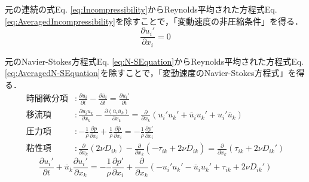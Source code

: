 \documentclass[12pt,a4paper]{jsarticle}
\begin{document}
元の連続の式Eq. \ref{eq:Incompressibility}からReynolds平均された方程式Eq. \ref{eq:AveragedIncompressibility}を除すことで，「変動速度の非圧縮条件」を得る．
\begin{equation}
  \frac{\partial u_i'}{\partial x_i} = 0 \tag{6.10}
  \label{eq:N-S-AveragedIncompressibility}
\end{equation}

元のNavier-Stokes方程式Eq. \ref{eq:N-SEquation}からReynolds平均された方程式Eq. \ref{eq:AveragedN-SEquation}を除すことで，「変動速度のNavier-Stokes方程式」を得る．
\begin{align*}
  時間微分項 &: \frac{\partial u_i}{\partial t} -\frac{\partial \bar{u}_i}{\partial t} = \frac{\partial u_i'}{\partial t} \\
  移流項    &: \frac{\partial u_i u_k}{\partial x_k} -\frac{\partial (\bar{u}_i \bar{u}_k)}{\partial x_k} = \frac{\partial}{\partial x_k}  (u_i' u_k' +\bar{u}_i u_k' +u_i' \bar{u}_k) \\
  圧力項    &: -\frac{1}{\rho} \frac{\partial p}{\partial x_i} +\frac{1}{\rho} \frac{\partial \bar{p}}{\partial x_i} = -\frac{1}{\rho} \frac{\partial p'}{\partial x_i} \\
  粘性項    &: \frac{\partial}{\partial x_k} (2 \nu D_{ik}) -\frac{\partial}{\partial x_k} (-\tau_{ik} +2 \nu \overline{D}_{ik}) = \frac{\partial}{\partial x_k} (\tau_{ik} +2 \nu D_{ik}')
\end{align*}
\begin{equation}
  \frac{\partial u_i'}{\partial t} +\bar{u}_k \frac{\partial u_i'}{\partial x_k} = -\frac{1}{\rho} \frac{\partial p'}{\partial x_i} +\frac{\partial}{\partial x_k} (-u_i' u_k' -\bar{u}_i u_k' +\tau_{ik} +2 \nu D_{ik}') \tag{6.11}
  \label{eq:N-S-AveragedN-SEquation}
\end{equation}
\end{document}
